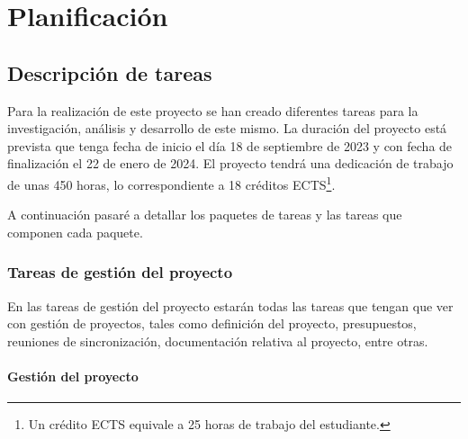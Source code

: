 \chapter{Planificación}
\label{cap:planificacion}


\section{Descripción de tareas}
\label{sec:descripcion_tareas}


Para la realización de este proyecto se han creado diferentes tareas para la investigación, análisis y desarrollo de este mismo. La duración del proyecto está prevista
que tenga fecha de inicio el día 18 de septiembre de 2023 y con fecha de finalización el 22 de enero de 2024. El proyecto tendrá una dedicación de trabajo de unas 450 horas,
lo correspondiente a 18 créditos ECTS\footnote{Un crédito ECTS equivale a 25 horas de trabajo del estudiante.\cite{ECTS}}.

A continuación pasaré a detallar los paquetes de tareas y las tareas que componen cada paquete.

\subsection{Tareas de gestión del proyecto}
\label{subsec:tareas_gestion}


En las tareas de gestión del proyecto estarán todas las tareas que tengan que ver con gestión de proyectos, tales como definición del proyecto, presupuestos, reuniones de
sincronización, documentación relativa al proyecto, entre otras.

\subsubsection{Gestión del proyecto}
\label{subsubsec:tareas_gestion}


